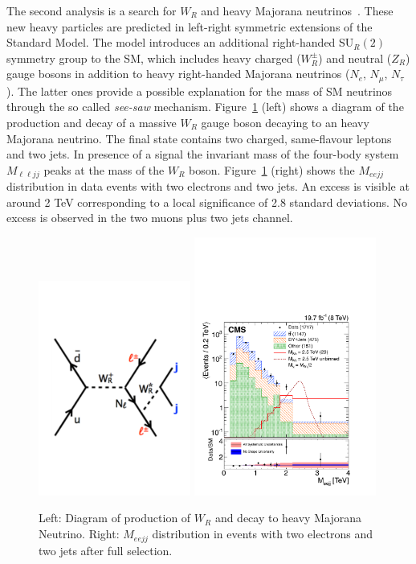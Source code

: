 \documentclass[epj]{webofc}
\begin{document}
The second analysis is a search for $W_R$ and heavy Majorana
neutrinos~\cite{Khachatryan:2014dka}. These new heavy particles are predicted in
left-right symmetric extensions of the Standard Model. 
The model introduces an additional right-handed SU$_R(2)$ symmetry
group to the SM, which includes heavy charged ($W^{\pm}_R$) and
neutral ($Z_R$) gauge bosons in addition to heavy right-handed
Majorana neutrinos ($N_e$, $N_\mu$, $N_{\tau}$). The latter ones
provide a possible explanation for the mass of SM neutrinos through
the so called {\it see-saw} mechanism.
Figure~\ref{heavyNeutrino} (left) shows a diagram of the production and decay of a
massive $W_R$ gauge boson decaying to an heavy Majorana neutrino.
The final state contains two charged, same-flavour leptons and two jets. In presence of
a signal the invariant mass of the four-body system $M_{\ell\ell jj}$ peaks
at the mass of the $W_R$ boson. Figure~\ref{heavyNeutrino} (right) shows the 
$M_{eejj}$ distribution in data events with two electrons and two jets. An excess is visible at around 2 TeV
corresponding to a local significance of 2.8 standard deviations. 
No excess is observed in the two muons plus two jets channel.
%
\begin{figure}[h]
\centering
\includegraphics[width=5cm,clip]{WRdiagram.pdf}
\includegraphics[width=6cm,clip]{CMS-EXO-13-008_Figure_002-a.pdf}
\caption{Left: Diagram of production of $W_R$ and decay to heavy
  Majorana Neutrino. Right: $M_{eejj}$ distribution in events with two electrons
  and two jets after full selection.}
\label{heavyNeutrino}       %
\end{figure}
%
\end{document}

